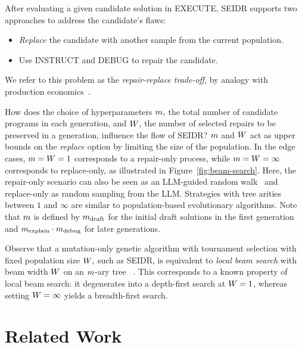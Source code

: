 After evaluating a given candidate solution in EXECUTE, SEIDR supports two approaches to address the candidate's flaws:
\begin{itemize}
\setlength{\parskip}{0pt}
\setlength\itemsep{0pt}
  \item \emph{Replace} the candidate with another sample from the current population.
  \item Use INSTRUCT and DEBUG to repair the candidate.
\end{itemize}
We refer to this problem as the \emph{repair-replace trade-off}, by analogy with production economics~\cite{jack2000:optimal}. 

How does the choice of hyperparameters $m{},$ the total number of candidate programs in each generation, and $W{},$ the number of selected repairs to be preserved in a generation, influence the flow of SEIDR?
$m$ and $W{}$ act as upper bounds on the \emph{replace} option by limiting the size of the population.
In the edge cases, $m{} = W{} = 1$ corresponds to a repair-only process, while $m{} = W{} = \infty$ corresponds to replace-only, as illustrated in Figure~\ref{fig:beam-search}. 
Here, the repair-only scenario can also be seen as an LLM-guided random walk~\cite{xia2020:random} and replace-only as random sampling from the LLM.
Strategies with tree arities between $1$ and $\infty$ are similar to population-based evolutionary algorithms.
Note that $m{}$ is defined by $m_\text{draft}$ for the initial draft solutions in the first generation and $m_\text{explain} \cdot m_\text{debug}$ for later generations. 

Observe that a mutation-only genetic algorithm with tournament selection with fixed population size $W{},$ such as SEIDR, is equivalent to \emph{local beam search} with beam width $W{}$ on an $m{}$-ary tree ~\cite[Section 4.1.4]{russell2010:artificial}. This corresponds to a known property of local beam search: it degenerates into a depth-first search at $W{} = 1$, whereas setting $W{} = \infty$ yields a breadth-first search.


\section{Related Work}
\label{sec:seidr-related-work}


